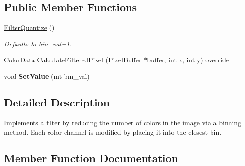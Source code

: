\subsection*{Public Member Functions}
\begin{DoxyCompactItemize}
\item 
\mbox{\label{classimage__tools_1_1FilterQuantize_aeba7a9d7a4260f74fdff4a550181a8e1}} 
\hyperlink{classimage__tools_1_1FilterQuantize_aeba7a9d7a4260f74fdff4a550181a8e1}{Filter\+Quantize} ()
\begin{DoxyCompactList}\small\item\em Defaults to bin\+\_\+val=1. \end{DoxyCompactList}\item 
\hyperlink{classimage__tools_1_1ColorData}{Color\+Data} \hyperlink{classimage__tools_1_1FilterQuantize_a312afa1aa4af5c58b7ec6d5faad0a176}{Calculate\+Filtered\+Pixel} (\hyperlink{classimage__tools_1_1PixelBuffer}{Pixel\+Buffer} $\ast$buffer, int x, int y) override
\item 
\mbox{\label{classimage__tools_1_1FilterQuantize_a8be8db0926f5701615320882f60f9d45}} 
void {\bfseries Set\+Value} (int bin\+\_\+val)
\end{DoxyCompactItemize}


\subsection{Detailed Description}
Implements a filter by reducing the number of colors in the image via a binning method. Each color channel is modified by placing it into the closest bin. 

\subsection{Member Function Documentation}
\mbox{\label{classimage__tools_1_1FilterQuantize_a312afa1aa4af5c58b7ec6d5faad0a176}} 
